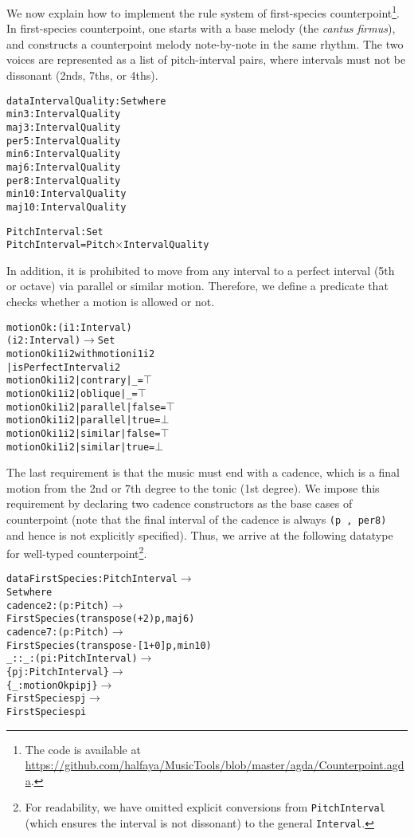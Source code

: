 \documentclass[sigplan,10pt,screen]{acmart}
\begin{document}
We now explain how to implement the rule system of 
first-species counterpoint\footnote{The code is available at \\
\url{https://github.com/halfaya/MusicTools/blob/master/agda/Counterpoint.agda}.}.
In first-species counterpoint, one starts with a base melody 
(the \emph{cantus firmus}), and constructs a counterpoint 
melody note-by-note in the same rhythm.
The two voices are represented as a list of pitch-interval pairs,
where intervals must not be dissonant (2nds, 7ths, or 4ths).

\begin{alltt}
data IntervalQuality : Set where
  min3  : IntervalQuality
  maj3  : IntervalQuality
  per5  : IntervalQuality
  min6  : IntervalQuality
  maj6  : IntervalQuality
  per8  : IntervalQuality
  min10 : IntervalQuality
  maj10 : IntervalQuality

PitchInterval : Set
PitchInterval = Pitch \(\times\) IntervalQuality
\end{alltt}

In addition, it is prohibited to move from any interval to
a perfect interval (5th or octave) via parallel or similar motion.
Therefore, we define a predicate that checks whether a motion 
is allowed or not.

\begin{alltt}
motionOk : (i1 : Interval)
           (i2 : Interval) \(\rightarrow\) Set
motionOk i1 i2 with motion i1 i2
         | isPerfectInterval i2
motionOk i1 i2 | contrary | \_     = \(\top\)
motionOk i1 i2 | oblique  | \_     = \(\top\)
motionOk i1 i2 | parallel | false = \(\top\)
motionOk i1 i2 | parallel | true  = \(\bot\)
motionOk i1 i2 | similar  | false = \(\top\)
motionOk i1 i2 | similar  | true  = \(\bot\)
\end{alltt}

The last requirement is that the music must end with a cadence,
which is a final motion from the 2nd or 7th degree to the tonic 
(1st degree). 
We impose this requirement by declaring two cadence constructors 
as the base cases of counterpoint (note that the final interval of
the cadence is always \texttt{(p\ ,\ per8)} and hence is not explicitly
specified).
Thus, we arrive at the following datatype for well-typed counterpoint\footnote{
For readability, we have omitted explicit conversions 
from \texttt{PitchInterval} (which ensures the interval is not dissonant) 
to the general \texttt{Interval}.}.

\begin{alltt}
data FirstSpecies : PitchInterval \(\rightarrow\)
                    Set where
  cadence2 : (p : Pitch) \(\rightarrow\)
    FirstSpecies (transpose (+ 2) p , maj6)
  cadence7 : (p : Pitch) \(\rightarrow\)
    FirstSpecies (transpose -[1+ 0 ] p , min10)
  \_::\_ : (pi : PitchInterval) \(\rightarrow\)
         \{pj : PitchInterval\} \(\rightarrow\)
         \{\_ : motionOk pi pj\} \(\rightarrow\)
         FirstSpecies pj \(\rightarrow\)
         FirstSpecies pi
\end{alltt}
\end{document}
